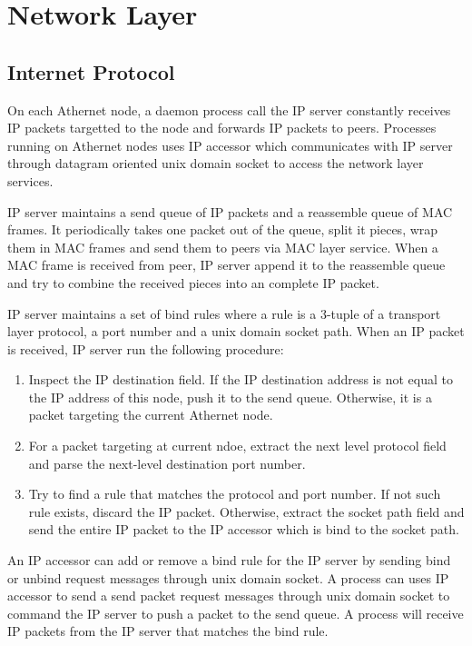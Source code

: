 \section{Network Layer}
\subsection{Internet Protocol}
On each Athernet node, a daemon process call the IP server constantly receives IP packets targetted to the node and forwards IP packets to peers.
Processes running on Athernet nodes uses IP accessor which communicates with IP server through datagram oriented unix domain socket to access the network layer services.\par


IP server maintains a send queue of IP packets and a reassemble queue of MAC frames.
It periodically takes one packet out of the queue, split it pieces, wrap them in MAC frames and send them to peers via MAC layer service.
When a MAC frame is received from peer, IP server append it to the reassemble queue and try to combine the received pieces into an complete IP packet.\par

IP server maintains a set of bind rules where
a rule is a 3-tuple of a transport layer protocol, a port number and a unix domain socket path.
When an IP packet is received, IP server run the following procedure:
\begin{enumerate}
	\item Inspect the IP destination field.
	      If the IP destination address is not equal to the IP address of this node, push it to the send queue.
	      Otherwise, it is a packet targeting the current Athernet node.
	\item For a packet targeting at current ndoe, extract the next level protocol field and parse the next-level destination port number.
	\item Try to find a rule that matches the protocol and port number.
	      If not such rule exists, discard the IP packet.
		  Otherwise, extract the socket path field and send the entire IP packet to the IP accessor which is bind to the socket path.
\end{enumerate}\par
An IP accessor can add or remove a bind rule for the IP server by sending bind or unbind request messages through unix domain socket.
A process can uses IP accessor to send a send packet request messages through unix domain socket to command the IP server to push a packet to the send queue.
A process will receive IP packets from the IP server that matches the bind rule.

